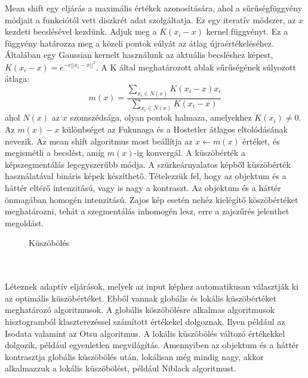 Mean shift egy eljárás a maximális értékek azonosítására, ahol a sűrűségfüggvény módjait a funkciótól vett diszkrét adat szolgáltatja. Ez egy iteratív módszer, az $x$ kezdeti becslésével kezdünk. Adjuk meg a $K(x_i - x)$ kernel függvényt. Ez a függvény határozza meg a közeli pontok súlyát az átlag újraértékeléséhez. Általában egy Gaussian kernelt használunk az aktuális becsléshez képest, $K (x_i - x) = e ^ {- c || x_i - x || ^ 2}$. A K által meghatározott ablak sűrűségének súlyozott átlaga: 
$$m(x)=\frac{\sum_{x_i \in N(x)}K(x_i-x)x_i}{\sum_{x_i \in N(x)}K(x_i-x)}$$
ahol $N(x)$ az $x$ szomszédsága, olyan pontok halmaza, amelyekhez $K(x_ {i}) \neq 0$.\\
Az $m (x) -x$ különbséget az Fukunaga és a Hostetler átlagos eltolódásának nevezik. Az mean shift algoritmus most beállítja az $x \leftarrow m(x)$ értéket, és megismétli a becslést, amíg $m(x)$-ig konvergál.
A küszöbérték a képszegmentálás legegyszerűbb módja. A szürkeárnyalatos képből küszöbérték használatával bináris képek készíthető. Tételezzük fel, hogy az objektum és a háttér eltérő intenzitású, vagy is nagy a kontraszt. Az objektum és a háttér önmagában homogén intenzitású. Zajos kép esetén nehéz kielégítő köszöbértéket meghatározni, tehát a szegmentálás inhomogén lesz, erre a zajszűrés jelenthet megoldást. 
\begin{figure}[ht]
\centering
{}
\caption{Küszöbölés} 
\label{fig: gaussgorbe}
\end{figure}
\\\\
Léteznek adaptív eljárások, melyek az input képhez automatikusan választják ki az optimális küszöbértéket. Ebből vannak globális és lokális küszöbértéket meghatározó algoritmusok. A globális köszöbölésre alkalmas algoritmusok hisztogramból klaszterezéssel számított értékekel dolgoznak. Ilyen például az Isodata valamint az Otsu algoritmus. A lokális küszöbölés változó értékekkel dolgozik, például egyenletlen megvilágítás. Amennyiben az objektum és a háttér kontrasztja globális küszöbölés után, lokálisan még mindig nagy, akkor alkalmazzuk a lokális küszöbölést, például Niblack algoritmust.
